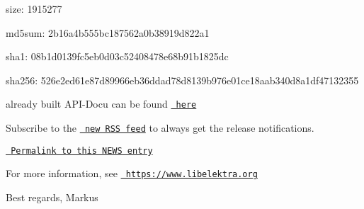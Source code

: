 \begin{DoxyItemize}
\item size\+: 1915277
\item md5sum\+: 2b16a4b555bc187562a0b38919d822a1
\item sha1\+: 08b1d0139fc5eb0d03c52408478e68b91b1825dc
\item sha256\+: 526e2ed61e87d89966eb36ddad78d8139b976e01ce18aab340d8a1df47132355
\end{DoxyItemize}

already built A\+P\+I-\/\+Docu can be found \href{https://doc.libelektra.org/api/0.8.10/html/}{\texttt{ here}}

Subscribe to the \href{https://doc.libelektra.org/news/feed.rss}{\texttt{ new R\+SS feed}} to always get the release notifications.

\href{https://doc.libelektra.org/news/6ce57ecf-420a-4a31-821e-1c5fe5532eb4.html}{\texttt{ Permalink to this N\+E\+WS entry}}

For more information, see \href{https://www.libelektra.org}{\texttt{ https\+://www.\+libelektra.\+org}}

Best regards, Markus 